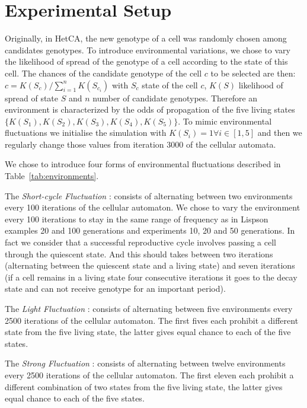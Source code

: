 \documentclass[letterpaper]{article}
\begin{document}
\section{Experimental Setup}
Originally, in HetCA, the new genotype of a cell was randomly chosen among candidates genotypes. To introduce environmental variations, we chose to vary the likelihood of spread of the genotype of a cell according to the state of this cell. The chances of the candidate genotype of the cell $c$ to be selected are then: $c=K(S_c)/\sum_{i=1}^{n} K(S_{c_i})$ with $S_c$ state of the cell $c$, $K(S)$ likelihood of spread of state $S$ and $n$ number of candidate genotypes. Therefore an environment is characterized by the odds of propagation of the five living states $\{K(S_1),K(S_2),K(S_3),K(S_4),K(S_5)\}$.   
To mimic environmental fluctuations we initialise the simulation with $K(S_i)=1  \forall i \in [1,5]$ and then we regularly change those values from iteration 3000 of the cellular automata. 

We chose to introduce four forms of environmental fluctuations described in Table~\ref{tab:environments}.

\noindent The \emph{Short-cycle Fluctuation} : consists of alternating between two environments every 100 iterations of the cellular automaton. We chose to vary the environment every 100 iterations to stay in the same range of frequency as in Lispson \cite{lipson2002origin} examples 20 and 100 generations and \cite{yu2007program} experiments 10, 20 and 50 generations. In fact we consider that a successful reproductive cycle involves passing a cell through the quiescent state. And this should takes between two iterations (alternating between the quiescent state and a living state) and seven iterations  (if a cell remains in a living state four consecutive iterations it goes to the decay state and can not receive genotype for an important period).

\noindent The \emph{Light Fluctuation} : consists of alternating between five environments every 2500 iterations of the cellular automaton. The first fives each prohibit a different state from the five living state, the latter gives equal chance to each of the five states.

\noindent The \emph{Strong Fluctuation} : consists of alternating between twelve environments every 2500 iterations of the cellular automaton. The first eleven each prohibit a different combination of two states from the five living state, the latter gives equal chance to each of the five states.
\end{document}
